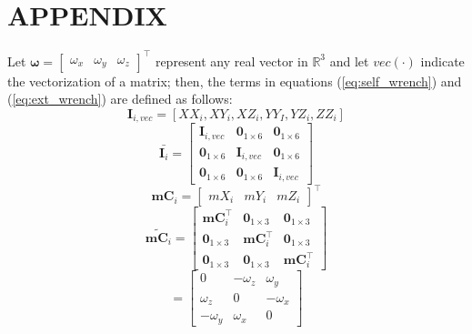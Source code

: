 \section*{APPENDIX}
Let $\bm{\omega} = \begin{bmatrix}\omega_x & \omega_y & \omega_z \end{bmatrix}^\intercal$ represent any real vector in $\mathbb{R}^3$ and let $vec(\cdot)$ indicate the vectorization of a matrix; then, the terms in equations (\ref{eq:self_wrench}) and (\ref{eq:ext_wrench}) are defined as follows:
\begin{equation*}
\pmb{I}_{i,vec} = [XX_i, XY_i , XZ_i , YY_I , YZ_i , ZZ_i ]
\end{equation*}
\begin{equation*}
\bar{\pmb{I}_i}= \begin{bmatrix}
\pmb{I}_{i,vec}               & \bm{0}_{1\times6} & \bm{0}_{1\times6}\\
\bm{0}_{1\times6} & \pmb{I}_{i,vec}               & \bm{0}_{1\times6}\\
\bm{0}_{1\times6} & \bm{0}_{1\times6} & \pmb{I}_{i,vec}
\end{bmatrix}
\end{equation*}
\begin{equation*}
\pmb{mC}_i = \begin{bmatrix}
mX_i & mY_i & mZ_i
\end{bmatrix}^\intercal
\end{equation*}
\begin{equation*}
\tilde{\pmb{mC}_i}= \begin{bmatrix}
\pmb{mC}_i^\intercal              & \bm{0}_{1\times3} & \bm{0}_{1\times3}\\
\bm{0}_{1\times3} & \pmb{mC}_i^\intercal              & \bm{0}_{1\times3}\\
\bm{0}_{1\times3} & \bm{0}_{1\times3} & \pmb{mC}_i^\intercal
\end{bmatrix}
\end{equation*}
\begin{equation*}
[\bm{\omega} \times] = \begin{bmatrix}
0                     & -\omega_z             & \omega_y \\
\omega_z              & 0                     & -\omega_x \\
-\omega_y             & \omega_x              & 0
\end{bmatrix}
\end{equation*}
